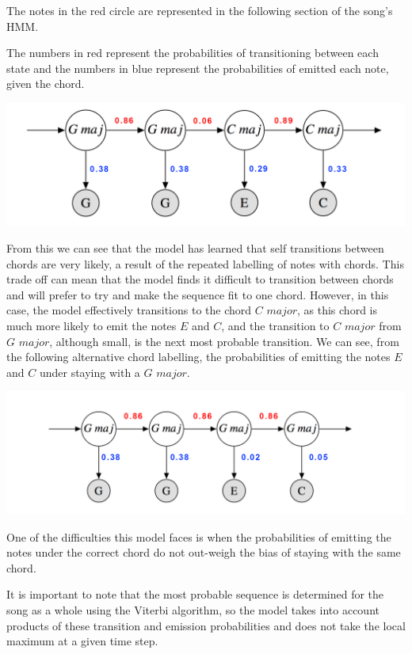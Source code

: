 \documentclass[bsc,singlespacing,logo, parskip, deptreport]{infthesis}
\begin{document}
The notes in the red circle are represented in the following section of the song's HMM.

The numbers in red represent the probabilities of transitioning between each state and the numbers in blue represent the probabilities of emitted each note, given the chord.

\begin{center}
  \includegraphics[scale=0.5]{minghmm.png}
\end{center}

From this we can see that the model has learned that self transitions between chords are very likely, a result of the repeated labelling of notes with chords. This trade off can mean that the model finds it difficult to transition between chords and will prefer to try and make the sequence fit to one chord. However, in this case, the model effectively transitions to the chord $C$ $major$, as this chord is much more likely to emit the notes $E$ and $C$, and the transition to $C$ $major$ from $G$ $major$, although small, is the next most probable transition. We can see, from the following alternative chord labelling, the probabilities of emitting the notes $E$ and $C$ under staying with a $G$ $major$.

\begin{center}
  \includegraphics[scale=0.5]{mingwronghmm.png}
\end{center}

One of the difficulties this model faces is when the probabilities of emitting the notes under the correct chord do not out-weigh the bias of staying with the same chord.

It is important to note that the most probable sequence is determined for the song as a whole using the Viterbi algorithm, so the model takes into account products of these transition and emission probabilities and does not take the local maximum at a given time step.
\end{document}
